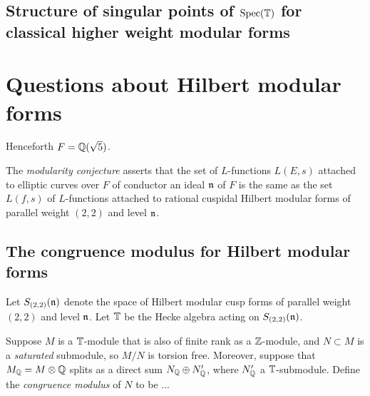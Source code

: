 \documentclass{article}
\begin{document}


\subsection{Structure of singular points of $\operatorname{Spec}(\mathbb{T})$ for classical higher weight modular forms}




\section{Questions about Hilbert modular forms}

Henceforth $F=\mathbb{Q}(\sqrt{5})$.

The {\em modularity conjecture} asserts that the set of $L$-functions
$L(E,s)$ attached to elliptic curves over $F$ of conductor an ideal
$\mathfrak{n}$ of $F$ is the same as the set $L(f,s)$ of $L$-functions attached
to rational cuspidal Hilbert modular forms of parallel weight $(2,2)$
and level $\mathfrak{n}$.



\subsection{The congruence modulus for Hilbert modular forms}

Let $S_{(2,2)}(\mathfrak{n})$ denote the space of Hilbert modular cusp forms of
parallel weight $(2,2)$ and level $\mathfrak{n}$.  Let $\mathbb{T}$ be the Hecke algebra
acting on $S_{(2,2)}(\mathfrak{n})$.  

Suppose $M$ is a $\mathbb{T}$-module that is also of
finite rank as a $\mathbb{Z}$-module, and $N\subset M$ is a {\em saturated}
submodule, so $M/N$ is torsion free.  Moreover, suppose that
$M_{\mathbb{Q}} = M\otimes\mathbb{Q}$ splits as a direct sum $N_{\mathbb{Q}} \oplus N'_{\mathbb{Q}}$,
where $N'_{\mathbb{Q}}$ a $\mathbb{T}$-submodule. 
Define the {\em congruence modulus} of $N$ to be ...
\end{document}
